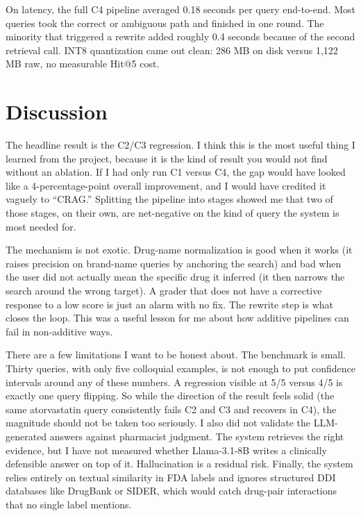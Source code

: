 \documentclass[12pt]{article}
\begin{document}
On latency, the full C4 pipeline averaged 0.18 seconds per query end-to-end. Most queries took the correct or ambiguous path and finished in one round. The minority that triggered a rewrite added roughly 0.4 seconds because of the second retrieval call. INT8 quantization came out clean: 286 MB on disk versus 1{,}122 MB raw, no measurable Hit@5 cost.

\section{Discussion}

The headline result is the C2/C3 regression. I think this is the most useful thing I learned from the project, because it is the kind of result you would not find without an ablation. If I had only run C1 versus C4, the gap would have looked like a 4-percentage-point overall improvement, and I would have credited it vaguely to ``CRAG.'' Splitting the pipeline into stages showed me that two of those stages, on their own, are net-negative on the kind of query the system is most needed for.

The mechanism is not exotic. Drug-name normalization is good when it works (it raises precision on brand-name queries by anchoring the search) and bad when the user did not actually mean the specific drug it inferred (it then narrows the search around the wrong target). A grader that does not have a corrective response to a low score is just an alarm with no fix. The rewrite step is what closes the loop. This was a useful lesson for me about how additive pipelines can fail in non-additive ways.

There are a few limitations I want to be honest about. The benchmark is small. Thirty queries, with only five colloquial examples, is not enough to put confidence intervals around any of these numbers. A regression visible at 5/5 versus 4/5 is exactly one query flipping. So while the direction of the result feels solid (the same atorvastatin query consistently fails C2 and C3 and recovers in C4), the magnitude should not be taken too seriously. I also did not validate the LLM-generated answers against pharmacist judgment. The system retrieves the right evidence, but I have not measured whether Llama-3.1-8B writes a clinically defensible answer on top of it. Hallucination is a residual risk. Finally, the system relies entirely on textual similarity in FDA labels and ignores structured DDI databases like DrugBank or SIDER, which would catch drug-pair interactions that no single label mentions.
\end{document}
